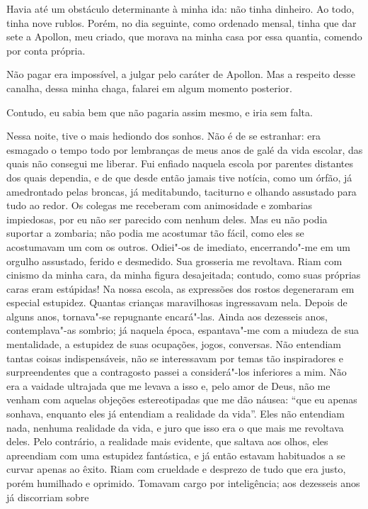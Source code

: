 Havia até um obstáculo determinante à minha ida: não tinha dinheiro. Ao
todo, tinha nove rublos. Porém, no dia seguinte, como ordenado mensal,
tinha que dar sete a Apollon, meu criado, que morava na minha casa por
essa quantia, comendo por conta própria.

Não pagar era impossível, a julgar pelo caráter de Apollon. Mas a
respeito desse canalha, dessa minha chaga, falarei em algum momento
posterior.

Contudo, eu sabia bem que não pagaria assim mesmo, e iria sem falta.

Nessa noite, tive o mais hediondo dos sonhos. Não é de se estranhar: era
esmagado o tempo todo por lembranças de meus anos de galé da vida
escolar, das quais não consegui me liberar. Fui enfiado naquela escola
por parentes distantes dos quais dependia, e de que desde então jamais
tive notícia, como um órfão, já amedrontado pelas broncas, já
meditabundo, taciturno e olhando assustado para tudo ao redor. Os
colegas me receberam com animosidade e zombarias impiedosas, por eu não
ser parecido com nenhum deles. Mas eu não podia suportar a zombaria; não
podia me acostumar tão fácil, como eles se acostumavam um com os outros.
Odiei"-os de imediato, encerrando"-me em um orgulho assustado, ferido e
desmedido. Sua grosseria me revoltava. Riam com cinismo da minha cara,
da minha figura desajeitada; contudo, como suas próprias caras eram
estúpidas! Na nossa escola, as expressões dos rostos degeneraram em
especial estupidez. Quantas crianças maravilhosas ingressavam nela.
Depois de alguns anos, tornava"-se repugnante encará"-las. Ainda aos
dezesseis anos, contemplava"-as sombrio; já naquela época, espantava"-me
com a miudeza de sua mentalidade, a estupidez de suas ocupações, jogos,
conversas. Não entendiam tantas coisas indispensáveis, não se
interessavam por temas tão inspiradores e surpreendentes que a
contragosto passei a considerá"-los inferiores a mim. Não era a vaidade
ultrajada que me levava a isso e, pelo amor de Deus, não me venham com
aquelas objeções estereotipadas que me dão náusea: ``que eu apenas
sonhava, enquanto eles já entendiam a realidade da vida''. Eles não
entendiam nada, nenhuma realidade da vida, e juro que isso era o que
mais me revoltava deles. Pelo contrário, a realidade mais evidente, que
saltava aos olhos, eles apreendiam com uma estupidez fantástica, e já
então estavam habituados a se curvar apenas ao êxito. Riam com crueldade
e desprezo de tudo que era justo, porém humilhado e oprimido. Tomavam
cargo por inteligência; aos dezesseis anos já discorriam sobre
